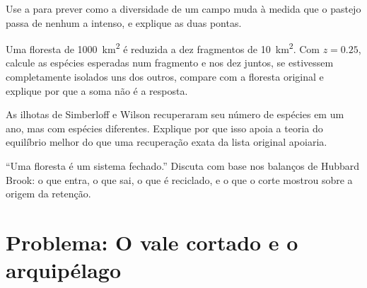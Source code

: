 \begin{exercise}[$\star\star$]\label{exo:b1:ecosystem-dynamics:9}
Use a  para prever como a
diversidade de um campo muda à medida que o pastejo passa de nenhum a
intenso, e explique as duas pontas.
\end{exercise}

\begin{exercise}[$\star\star\star$]\label{exo:b1:ecosystem-dynamics:10}
Uma floresta de \qty{1000}{km^2} é reduzida a dez fragmentos de
\qty{10}{km^2}. Com $z = 0.25$, calcule as espécies esperadas num
fragmento e nos dez juntos, se estivessem completamente isolados uns
dos outros, compare com a floresta original e explique por que a soma
não é a resposta.
\end{exercise}

\begin{exercise}[$\star\star\star$]\label{exo:b1:ecosystem-dynamics:11}
As ilhotas de Simberloff e Wilson recuperaram seu número de espécies
em um ano, mas com espécies diferentes. Explique por que isso apoia a
teoria do equilíbrio melhor do que uma recuperação exata da lista
original apoiaria.
\end{exercise}

\begin{exercise}[$\star\star\star$]\label{exo:b1:ecosystem-dynamics:12}
``Uma floresta  é um sistema fechado.'' Discuta com base nos
balanços de Hubbard Brook: o que entra, o que sai, o que é reciclado,
e o que o corte mostrou sobre a origem da retenção.
\end{exercise}

\section{Problema: O vale cortado e o arquipélago}

